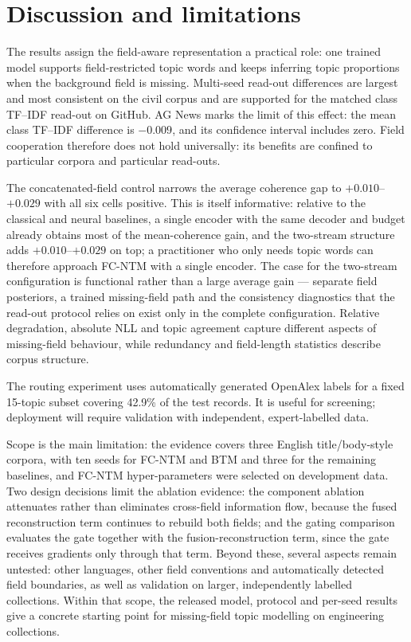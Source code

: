 \documentclass[pdflatex,sn-basic]{sn-jnl}
\newcommand{\fcntm}{FC-NTM}
\begin{document}
\section{Discussion and limitations}
\label{sec:discussion}

The results assign the field-aware representation a practical role: one trained model supports
field-restricted topic words and keeps inferring topic proportions when the background field is
missing. Multi-seed read-out differences are largest and most consistent on the civil corpus and
are supported for the matched class TF--IDF read-out on GitHub. AG News marks the limit of this
effect: the mean class TF--IDF difference is $-0.009$, and its confidence interval includes zero.
Field cooperation therefore does not hold universally: its benefits are confined to particular
corpora and particular read-outs.

The concatenated-field control narrows the average coherence gap to $+0.010$--$+0.029$ with
all six cells positive. This is itself informative: relative to the classical and neural
baselines, a single encoder with the same decoder and budget already obtains most of the
mean-coherence gain, and the two-stream structure adds $+0.010$--$+0.029$ on top; a
practitioner who only needs topic words can therefore approach \fcntm{} with a single
encoder. The case for the two-stream configuration is
functional rather than a large average gain --- separate field posteriors, a trained
missing-field path and the consistency diagnostics that the read-out protocol relies on exist
only in the complete configuration. Relative degradation, absolute NLL and topic agreement
capture different aspects of missing-field behaviour, while redundancy and field-length
statistics describe corpus structure.

The routing experiment uses automatically generated OpenAlex labels for a fixed 15-topic subset
covering 42.9\% of the test records. It is useful for screening; deployment will require
validation with independent, expert-labelled data.

Scope is the main limitation: the evidence covers three English title/body-style corpora, with
ten seeds for \fcntm{} and BTM and three for the remaining baselines, and \fcntm{}
hyper-parameters were selected on development data. Two design decisions limit the ablation
evidence: the component ablation attenuates rather than eliminates cross-field information flow,
because the fused reconstruction term continues to rebuild both fields; and the gating comparison
evaluates the gate together with the fusion-reconstruction term, since the gate receives
gradients only through that term. Beyond these, several aspects remain untested: other
languages, other field conventions and automatically detected field boundaries, as well as
validation on larger, independently labelled collections. Within that scope, the
released model, protocol and per-seed results give a concrete starting point for missing-field
topic modelling on engineering collections.
\end{document}
